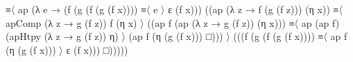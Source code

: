 \documentclass[
  11pt,
  oneside,
  article]{memoir}
\newenvironment{Shaded}{}{}
\newcommand{\NormalTok}[1]{#1}
\newcommand{\OtherTok}[1]{\textcolor[rgb]{0.00,0.44,0.13}{#1}}
\theoremstyle{definition}
\theoremstyle{plain}
\newcommand{\0}{\textsf{0}}
\newcommand{\1}{\tn{\textsf{1}}}
\begin{document}
\begin{Shaded}
\begin{Highlighting}[]
\NormalTok{                    ≡〈 ap }\OtherTok{(λ}\NormalTok{ e }\OtherTok{→} \OtherTok{(}\NormalTok{f }\OtherTok{(}\NormalTok{g }\OtherTok{(}\NormalTok{f }\OtherTok{(}\NormalTok{g }\OtherTok{(}\NormalTok{f x}\OtherTok{))))}\NormalTok{ ≡〈 e 〉 ε }\OtherTok{(}\NormalTok{f x}\OtherTok{)))} 
                          \OtherTok{((}\NormalTok{ap }\OtherTok{(λ}\NormalTok{ z }\OtherTok{→}\NormalTok{ f }\OtherTok{(}\NormalTok{g }\OtherTok{(}\NormalTok{f z}\OtherTok{)))} \OtherTok{(}\NormalTok{η x}\OtherTok{))} 
\NormalTok{                           ≡〈 apComp }\OtherTok{(λ}\NormalTok{ z }\OtherTok{→}\NormalTok{ g }\OtherTok{(}\NormalTok{f z}\OtherTok{))}\NormalTok{ f }\OtherTok{(}\NormalTok{η x}\OtherTok{)}\NormalTok{ 〉 }
                           \OtherTok{((}\NormalTok{ap f }\OtherTok{(}\NormalTok{ap }\OtherTok{(λ}\NormalTok{ z }\OtherTok{→}\NormalTok{ g }\OtherTok{(}\NormalTok{f z}\OtherTok{))} \OtherTok{(}\NormalTok{η x}\OtherTok{)))} 
\NormalTok{                           ≡〈 ap }\OtherTok{(}\NormalTok{ap f}\OtherTok{)} \OtherTok{(}\NormalTok{apHtpy }\OtherTok{(λ}\NormalTok{ z }\OtherTok{→}\NormalTok{ g }\OtherTok{(}\NormalTok{f z}\OtherTok{))}\NormalTok{ η}\OtherTok{)}\NormalTok{ 〉 }
                           \OtherTok{(}\NormalTok{ap f }\OtherTok{(}\NormalTok{η }\OtherTok{(}\NormalTok{g }\OtherTok{(}\NormalTok{f x}\OtherTok{)))}\NormalTok{ □}\OtherTok{)))}\NormalTok{ 〉 }
                    \OtherTok{(((}\NormalTok{f }\OtherTok{(}\NormalTok{g }\OtherTok{(}\NormalTok{f }\OtherTok{(}\NormalTok{g }\OtherTok{(}\NormalTok{f x}\OtherTok{))))}\NormalTok{ ≡〈 ap f }\OtherTok{(}\NormalTok{η }\OtherTok{(}\NormalTok{g }\OtherTok{(}\NormalTok{f x}\OtherTok{)))}\NormalTok{ 〉 ε }\OtherTok{(}\NormalTok{f x}\OtherTok{)))}\NormalTok{ □}\OtherTok{)))))}


\end{Highlighting}
\end{Shaded}
\end{document}
